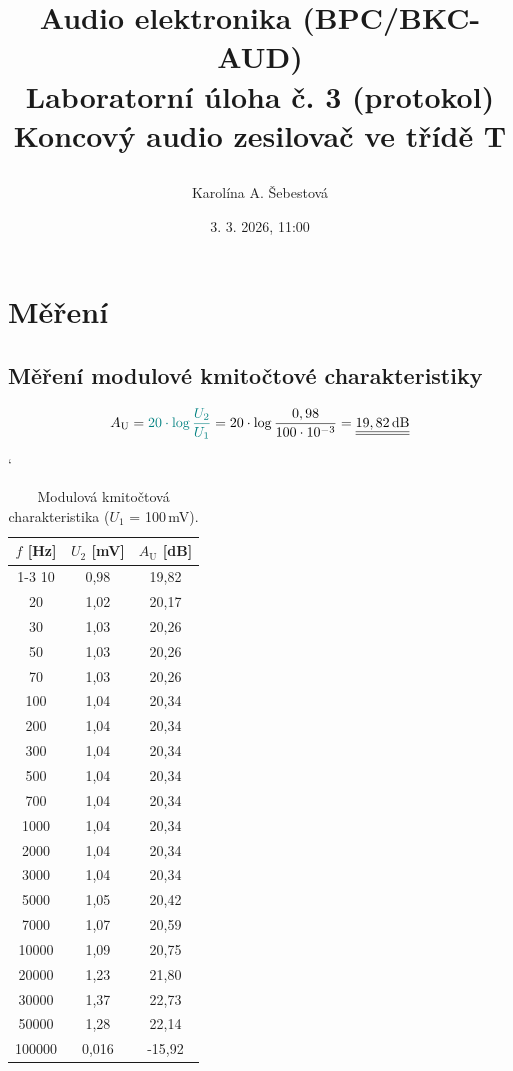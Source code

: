 \documentclass[a4paper, czech]{article}
\title{
    \begin{framed}
        \setstretch{1.5}
        {\large Audio elektronika (BPC/BKC-AUD)}\\
        Laboratorní úloha č. 3 (protokol)\\
        \textbf{Koncový audio zesilovač ve třídě T}
    \end{framed}
    }
\author{Karolína A. Šebestová}
\date{3. 3. 2026, 11:00}
\begin{document}
\maketitle

\section{Měření}

\subsection{Měření modulové kmitočtové charakteristiky}

\begin{equation}
    A_\text{U} = \textcolor{teal}{20 \cdot \log \frac{U_2}{U_1}} = 20 \cdot \log \frac{0,98}{100 \cdot 10^{-3}} = \underline{\underline{19,82\,\text{dB}}}
\end{equation}

\begin{table}[H]
    \catcode`
    \centering
    \caption{Modulová kmitočtová charakteristika ($U_1$ = 100\,mV).}

    \begin{tabular}{ccc}
        \toprule
        $f$ [Hz] & $U_2$ [mV] & $A_\text{U}$ [dB] \\
        \cmidrule(rl){1-3}
        10     & 0,98  & 19,82  \\
        20     & 1,02  & 20,17  \\
        30     & 1,03  & 20,26  \\
        50     & 1,03  & 20,26  \\
        70     & 1,03  & 20,26  \\
        100    & 1,04  & 20,34  \\
        200    & 1,04  & 20,34  \\
        300    & 1,04  & 20,34  \\
        500    & 1,04  & 20,34  \\
        700    & 1,04  & 20,34  \\
        1000   & 1,04  & 20,34  \\
        2000   & 1,04  & 20,34  \\
        3000   & 1,04  & 20,34  \\
        5000   & 1,05  & 20,42  \\
        7000   & 1,07  & 20,59  \\
        10000  & 1,09  & 20,75  \\
        20000  & 1,23  & 21,80  \\
        30000  & 1,37  & 22,73  \\
        50000  & 1,28  & 22,14  \\
        100000 & 0,016 & -15,92 \\
        \toprule
    \end{tabular}
\end{table}
\end{document}
